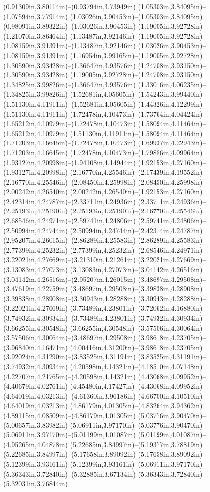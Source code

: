 (0.91309in,3.80114in)--(0.93794in,3.73949in) (1.05303in,3.84095in)--(1.07594in,3.77914in) (1.03026in,3.90453in)--(1.05303in,3.84095in) (0.98091in,3.89322in)--(1.03026in,3.90453in) (1.19005in,3.92728in)--(1.21070in,3.86464in) (1.13487in,3.92146in)--(1.19005in,3.92728in) (1.08159in,3.91391in)--(1.13487in,3.92146in) (1.03026in,3.90453in)--(1.08159in,3.91391in) (1.16954in,3.99165in)--(1.19005in,3.92728in) (1.30590in,3.93428in)--(1.36647in,3.93576in) (1.24708in,3.93150in)--(1.30590in,3.93428in) (1.19005in,3.92728in)--(1.24708in,3.93150in) (1.34825in,3.99826in)--(1.36647in,3.93576in) (1.33016in,4.06235in)--(1.34825in,3.99826in) (1.52681in,4.05605in)--(1.54243in,3.99440in) (1.51130in,4.11911in)--(1.52681in,4.05605in) (1.44326in,4.12299in)--(1.51130in,4.11911in) (1.72478in,4.10473in)--(1.73764in,4.04424in) (1.65212in,4.10979in)--(1.72478in,4.10473in) (1.58094in,4.11464in)--(1.65212in,4.10979in) (1.51130in,4.11911in)--(1.58094in,4.11464in) (1.71203in,4.16645in)--(1.72478in,4.10473in) (1.69937in,4.22943in)--(1.71203in,4.16645in) (1.72478in,4.10473in)--(1.79886in,4.09964in) (1.93127in,4.20998in)--(1.94108in,4.14944in) (1.92153in,4.27160in)--(1.93127in,4.20998in) (2.16770in,4.25546in)--(2.17439in,4.19552in) (2.16770in,4.25546in)--(2.08450in,4.25998in) (2.08450in,4.25998in)--(2.00242in,4.26540in) (2.00242in,4.26540in)--(1.92153in,4.27160in) (2.42314in,4.24787in)--(2.33711in,4.24936in) (2.33711in,4.24936in)--(2.25193in,4.25190in) (2.25193in,4.25190in)--(2.16770in,4.25546in) (2.68546in,4.24971in)--(2.59741in,4.24806in) (2.59741in,4.24806in)--(2.50994in,4.24744in) (2.50994in,4.24744in)--(2.42314in,4.24787in) (2.95207in,4.26015in)--(2.86289in,4.25583in) (2.86289in,4.25583in)--(2.77399in,4.25232in) (2.77399in,4.25232in)--(2.68546in,4.24971in) (3.22021in,4.27669in)--(3.21310in,4.21261in) (3.22021in,4.27669in)--(3.13083in,4.27073in) (3.13083in,4.27073in)--(3.04142in,4.26516in) (3.04142in,4.26516in)--(2.95207in,4.26015in) (3.48697in,4.29508in)--(3.47619in,4.22759in) (3.48697in,4.29508in)--(3.39838in,4.28908in) (3.39838in,4.28908in)--(3.30943in,4.28288in) (3.30943in,4.28288in)--(3.22021in,4.27669in) (3.73489in,4.23801in)--(3.72062in,4.16880in) (3.74932in,4.30934in)--(3.73489in,4.23801in) (3.74932in,4.30934in)--(3.66255in,4.30548in) (3.66255in,4.30548in)--(3.57506in,4.30064in) (3.57506in,4.30064in)--(3.48697in,4.29508in) (3.98618in,4.23705in)--(3.96840in,4.16471in) (4.00416in,4.31200in)--(3.98618in,4.23705in) (3.92024in,4.31290in)--(3.83525in,4.31191in) (3.83525in,4.31191in)--(3.74932in,4.30934in) (4.20598in,4.14321in)--(4.18510in,4.07148in) (4.22707in,4.21765in)--(4.20598in,4.14321in) (4.43068in,4.09952in)--(4.40679in,4.02761in) (4.45480in,4.17427in)--(4.43068in,4.09952in) (4.64019in,4.03213in)--(4.61360in,3.96186in) (4.66700in,4.10510in)--(4.64019in,4.03213in) (4.86179in,4.01305in)--(4.83264in,3.94362in) (4.89115in,4.08509in)--(4.86179in,4.01305in) (5.03776in,3.90470in)--(5.00657in,3.83982in) (5.06911in,3.97170in)--(5.03776in,3.90470in) (5.06911in,3.97170in)--(5.01199in,4.01087in) (5.01199in,4.01087in)--(4.95265in,4.04878in) (5.22685in,3.84997in)--(5.19377in,3.78819in) (5.22685in,3.84997in)--(5.17658in,3.89092in) (5.17658in,3.89092in)--(5.12399in,3.93161in) (5.12399in,3.93161in)--(5.06911in,3.97170in) (5.36343in,3.72840in)--(5.32885in,3.67134in) (5.36343in,3.72840in)--(5.32031in,3.76844in) 